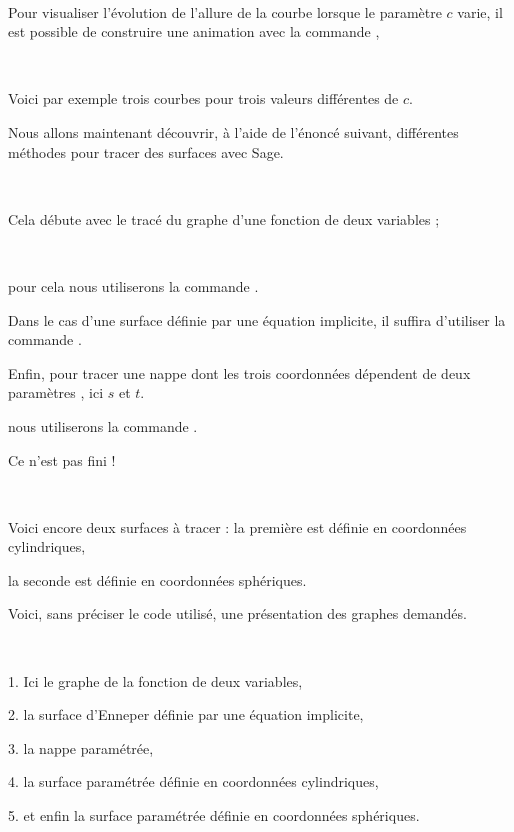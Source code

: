 ~


Pour visualiser l'évolution de l'allure de la courbe lorsque le paramètre $c$ varie, il est possible de construire 
une animation avec la commande  , 


~


Voici par exemple trois courbes pour trois valeurs différentes de $c$. %


\change

\change

\change

\diapo


Nous allons maintenant découvrir, à l'aide de l'énoncé suivant, différentes méthodes 
pour tracer des surfaces avec Sage.

~

Cela débute avec le tracé du graphe d'une fonction de deux variables ;

~

pour cela nous utiliserons la commande .

\change 

Dans le cas d'une surface définie par une équation implicite, il suffira d'utiliser la commande
 .

\change

Enfin, pour tracer une nappe dont les trois coordonnées dépendent de deux paramètres , ici $s$ et $t$.

nous utiliserons la commande .
 


\diapo

Ce n'est pas fini !

~


Voici encore deux surfaces  à tracer :
la première est définie en coordonnées cylindriques,

\change
la seconde est définie en coordonnées sphériques.


\diapo

Voici, sans préciser le code utilisé, une présentation des graphes demandés. 

~


1. Ici le graphe de la fonction de deux variables,

\change

2. la surface d'Enneper définie par une équation implicite,

\change

3. la nappe paramétrée,

\change

4. la surface paramétrée définie en coordonnées cylindriques,

\change

5. et enfin la surface paramétrée définie en coordonnées sphériques.


